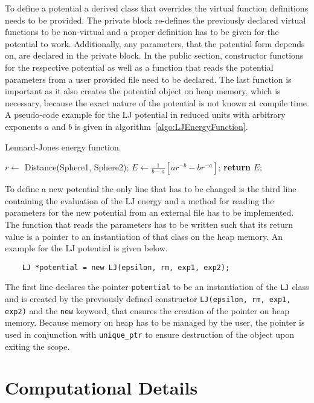 To define a potential a derived class that overrides the virtual function
definitions needs to be provided. The private block re-defines the previously
declared virtual functions to be non-virtual and a proper definition has to be
given for the potential to work. Additionally, any parameters, that the
potential form depends on, are declared in the private block. In the
public section, constructor functions for the respective potential as well as a
function that reads the potential parameters from a user provided file need to
be declared. The last function is important as it also creates the potential
object on heap memory, which is necessary, because the exact nature of the
potential is not known at compile time. A pseudo-code example for the \ac{LJ}
potential in reduced units with arbitrary exponents $a$ and $b$ is given in
algorithm~\ref{algo:LJEnergyFunction}.
%
\begin{algorithm}
    \caption{Lennard-Jones energy function.}
    \label{algo:LJEnergyFunction}
    \begin{algorithmic}[1]
            \State $r \gets$ Distance(Sphere1, Sphere2);
            \State $E \gets \frac{1}{b-a}\left[ar^{-b}-br^{-a}\right]$;
            \State \textbf{return} $E$;
        \EndProcedure
    \end{algorithmic}
\end{algorithm}
%
To define a new potential the only line that has to be changed is the third
line containing the evaluation of the \ac{LJ} energy and a method for reading
the parameters for the new potential from an external file has to be
implemented. The function that reads the parameters has to be written such
that its return value is a pointer to an instantiation of that class on the
heap memory. An example for the \ac{LJ} potential is given below.
%
\begin{verbatim}
    LJ *potential = new LJ(epsilon, rm, exp1, exp2);
\end{verbatim}
%
The first line declares the pointer \verb|potential| to be an instantiation of
the \verb|LJ| class and is created by the previously defined constructor
\verb|LJ(epsilon, rm, exp1, exp2)| and the \verb|new| keyword, that ensures the
creation of the pointer on heap memory. Because memory on heap has to be
managed by the user, the pointer is used in conjunction with \verb|unique_ptr|
to ensure destruction of the object upon exiting the scope.

\chapter{Computational Details}
\label{sec:ComputationalDetails}

